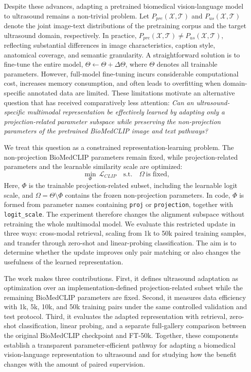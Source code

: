 \documentclass[runningheads]{llncs}
\begin{document}
Despite these advances, adapting a pretrained biomedical vision-language model to ultrasound remains a non-trivial problem. Let $P_{pre}(\mathcal{X},\mathcal{T})$ and $P_{us}(\mathcal{X},\mathcal{T})$ denote the joint image-text distributions of the pretraining corpus and the target ultrasound domain, respectively. In practice, $P_{pre}(\mathcal{X},\mathcal{T})\neq P_{us}(\mathcal{X},\mathcal{T})$, reflecting substantial differences in image characteristics, caption style, anatomical coverage, and semantic granularity. A straightforward solution is to fine-tune the entire model, $\Theta\leftarrow\Theta+\Delta\Theta$, where $\Theta$ denotes all trainable parameters. However, full-model fine-tuning incurs considerable computational cost, increases memory consumption, and often leads to overfitting when domain-specific annotated data are limited. These limitations motivate an alternative question that has received comparatively less attention: \textit{Can an ultrasound-specific multimodal representation be effectively learned by adapting only a projection-related parameter subspace while preserving the non-projection parameters of the pretrained BioMedCLIP image and text pathways?}

We treat this question as a constrained representation-learning problem. The non-projection BioMedCLIP parameters remain fixed, while projection-related parameters and the learnable similarity scale are optimized:
\begin{equation}
\min_{\Phi}\, \mathcal{L}_{CLIP}
\quad\text{s.t.}\quad
\Omega\ \text{is fixed},
\end{equation}
Here, $\Phi$ is the trainable projection-related subset, including the learnable logit scale, and $\Omega=\Theta\setminus\Phi$ contains the frozen non-projection parameters. In code, $\Phi$ is formed from parameter names containing \texttt{proj} or \texttt{projection}, together with \texttt{logit\_scale}. The experiment therefore changes the alignment subspace without retraining the whole multimodal model.
We evaluate this restricted update in three ways: cross-modal retrieval, scaling from 1k to 50k paired training samples, and transfer through zero-shot and linear-probing classification. The aim is to determine whether the update improves only pair matching or also changes the usefulness of the learned representation.

The work makes three contributions. First, it defines ultrasound adaptation as optimization over an implementation-defined projection-related subset while the remaining BioMedCLIP parameters are fixed. Second, it measures data efficiency with 1k, 5k, 10k, and 50k training pairs under the same controlled validation and test protocol. Third, it evaluates the adapted representation with retrieval, zero-shot classification, linear probing, and a separate full-gallery comparison between the original BioMedCLIP checkpoint and FT-50k. Together, these components establish a transparent parameter-efficient pathway for adapting a biomedical vision-language representation to ultrasound and for studying how the benefit changes with the amount of paired supervision.
\end{document}
